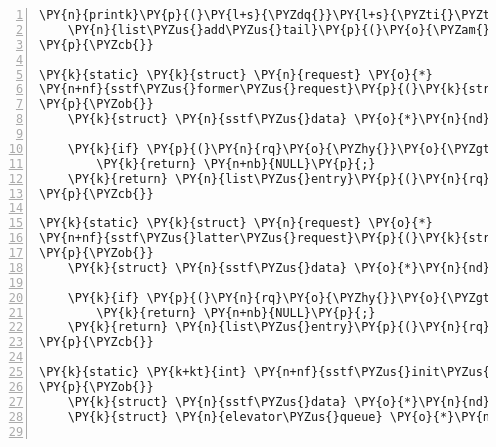 \begin{Verbatim}[commandchars=\\\{\},numbers=left,firstnumber=1,stepnumber=1]
	\PY{n}{printk}\PY{p}{(}\PY{l+s}{\PYZdq{}}\PY{l+s}{\PYZti{}\PYZti{}\PYZti{}\PYZti{} \PYZhy{}\PYZhy{}\PYZhy{}\PYZhy{}\PYZhy{}\PYZhy{} }\PY{l+s+se}{\PYZbs{}n}\PY{l+s}{\PYZdq{}}\PY{p}{)}\PY{p}{;}
	\PY{n}{list\PYZus{}add\PYZus{}tail}\PY{p}{(}\PY{o}{\PYZam{}}\PY{n}{rq}\PY{o}{\PYZhy{}}\PY{o}{\PYZgt{}}\PY{n}{queuelist}\PY{p}{,} \PY{o}{\PYZam{}}\PY{n}{nd}\PY{o}{\PYZhy{}}\PY{o}{\PYZgt{}}\PY{n}{queue}\PY{p}{)}\PY{p}{;}
\PY{p}{\PYZcb{}}

\PY{k}{static} \PY{k}{struct} \PY{n}{request} \PY{o}{*}
\PY{n+nf}{sstf\PYZus{}former\PYZus{}request}\PY{p}{(}\PY{k}{struct} \PY{n}{request\PYZus{}queue} \PY{o}{*}\PY{n}{q}\PY{p}{,} \PY{k}{struct} \PY{n}{request} \PY{o}{*}\PY{n}{rq}\PY{p}{)}
\PY{p}{\PYZob{}}
	\PY{k}{struct} \PY{n}{sstf\PYZus{}data} \PY{o}{*}\PY{n}{nd} \PY{o}{=} \PY{n}{q}\PY{o}{\PYZhy{}}\PY{o}{\PYZgt{}}\PY{n}{elevator}\PY{o}{\PYZhy{}}\PY{o}{\PYZgt{}}\PY{n}{elevator\PYZus{}data}\PY{p}{;}

	\PY{k}{if} \PY{p}{(}\PY{n}{rq}\PY{o}{\PYZhy{}}\PY{o}{\PYZgt{}}\PY{n}{queuelist}\PY{p}{.}\PY{n}{prev} \PY{o}{=}\PY{o}{=} \PY{o}{\PYZam{}}\PY{n}{nd}\PY{o}{\PYZhy{}}\PY{o}{\PYZgt{}}\PY{n}{queue}\PY{p}{)}
		\PY{k}{return} \PY{n+nb}{NULL}\PY{p}{;}
	\PY{k}{return} \PY{n}{list\PYZus{}entry}\PY{p}{(}\PY{n}{rq}\PY{o}{\PYZhy{}}\PY{o}{\PYZgt{}}\PY{n}{queuelist}\PY{p}{.}\PY{n}{prev}\PY{p}{,} \PY{k}{struct} \PY{n}{request}\PY{p}{,} \PY{n}{queuelist}\PY{p}{)}\PY{p}{;}
\PY{p}{\PYZcb{}}

\PY{k}{static} \PY{k}{struct} \PY{n}{request} \PY{o}{*}
\PY{n+nf}{sstf\PYZus{}latter\PYZus{}request}\PY{p}{(}\PY{k}{struct} \PY{n}{request\PYZus{}queue} \PY{o}{*}\PY{n}{q}\PY{p}{,} \PY{k}{struct} \PY{n}{request} \PY{o}{*}\PY{n}{rq}\PY{p}{)}
\PY{p}{\PYZob{}}
	\PY{k}{struct} \PY{n}{sstf\PYZus{}data} \PY{o}{*}\PY{n}{nd} \PY{o}{=} \PY{n}{q}\PY{o}{\PYZhy{}}\PY{o}{\PYZgt{}}\PY{n}{elevator}\PY{o}{\PYZhy{}}\PY{o}{\PYZgt{}}\PY{n}{elevator\PYZus{}data}\PY{p}{;}

	\PY{k}{if} \PY{p}{(}\PY{n}{rq}\PY{o}{\PYZhy{}}\PY{o}{\PYZgt{}}\PY{n}{queuelist}\PY{p}{.}\PY{n}{next} \PY{o}{=}\PY{o}{=} \PY{o}{\PYZam{}}\PY{n}{nd}\PY{o}{\PYZhy{}}\PY{o}{\PYZgt{}}\PY{n}{queue}\PY{p}{)}
		\PY{k}{return} \PY{n+nb}{NULL}\PY{p}{;}
	\PY{k}{return} \PY{n}{list\PYZus{}entry}\PY{p}{(}\PY{n}{rq}\PY{o}{\PYZhy{}}\PY{o}{\PYZgt{}}\PY{n}{queuelist}\PY{p}{.}\PY{n}{next}\PY{p}{,} \PY{k}{struct} \PY{n}{request}\PY{p}{,} \PY{n}{queuelist}\PY{p}{)}\PY{p}{;}
\PY{p}{\PYZcb{}}

\PY{k}{static} \PY{k+kt}{int} \PY{n+nf}{sstf\PYZus{}init\PYZus{}queue}\PY{p}{(}\PY{k}{struct} \PY{n}{request\PYZus{}queue} \PY{o}{*}\PY{n}{q}\PY{p}{,} \PY{k}{struct} \PY{n}{elevator\PYZus{}type} \PY{o}{*}\PY{n}{e}\PY{p}{)}
\PY{p}{\PYZob{}}
	\PY{k}{struct} \PY{n}{sstf\PYZus{}data} \PY{o}{*}\PY{n}{nd}\PY{p}{;}
	\PY{k}{struct} \PY{n}{elevator\PYZus{}queue} \PY{o}{*}\PY{n}{eq}\PY{p}{;}


\end{Verbatim}
